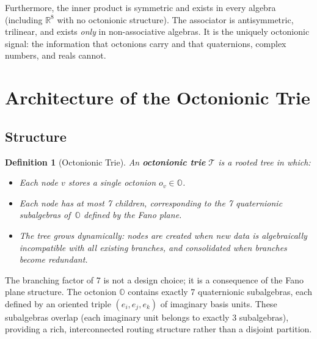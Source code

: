 \documentclass[11pt,a4paper]{article}
\newtheorem{definition}[theorem]{Definition}
\theoremstyle{definition}
\theoremstyle{remark}
\newcommand{\Oct}{\mathbb{O}}
\newcommand{\Real}{\mathbb{R}}
\begin{document}
Furthermore, the inner product is symmetric and exists in every algebra (including $\Real^8$ with no octonionic structure). The associator is antisymmetric, trilinear, and exists \emph{only} in non-associative algebras. It is the uniquely octonionic signal: the information that octonions carry and that quaternions, complex numbers, and reals cannot.

\section{Architecture of the Octonionic Trie}
\label{sec:architecture}

\subsection{Structure}

\begin{definition}[Octonionic Trie]
An \textbf{octonionic trie} $\mathcal{T}$ is a rooted tree in which:
\begin{itemize}[nosep]
  \item Each node $v$ stores a single octonion $o_v \in \Oct$.
  \item Each node has at most 7 children, corresponding to the 7 quaternionic subalgebras of~$\Oct$ defined by the Fano plane.
  \item The tree grows dynamically: nodes are created when new data is algebraically incompatible with all existing branches, and consolidated when branches become redundant.
\end{itemize}
\end{definition}

The branching factor of 7 is not a design choice; it is a consequence of the Fano plane structure. The octonion $\Oct$ contains exactly 7 quaternionic subalgebras, each defined by an oriented triple $(e_i, e_j, e_k)$ of imaginary basis units. These subalgebras overlap (each imaginary unit belongs to exactly 3 subalgebras), providing a rich, interconnected routing structure rather than a disjoint partition.
\end{document}
